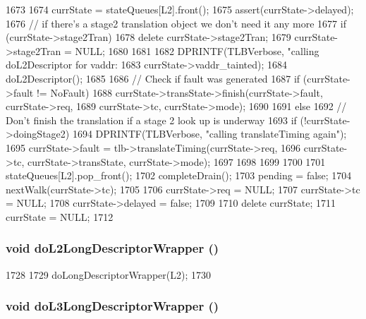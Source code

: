 \begin{DoxyCode}
1673 {
1674     currState = stateQueues[L2].front();
1675     assert(currState->delayed);
1676     // if there's a stage2 translation object we don't need it any more
1677     if (currState->stage2Tran) {
1678         delete currState->stage2Tran;
1679         currState->stage2Tran = NULL;
1680     }
1681 
1682     DPRINTF(TLBVerbose, "calling doL2Descriptor for vaddr:%
1683             currState->vaddr_tainted);
1684     doL2Descriptor();
1685 
1686     // Check if fault was generated
1687     if (currState->fault != NoFault) {
1688         currState->transState->finish(currState->fault, currState->req,
1689                                       currState->tc, currState->mode);
1690     }
1691     else {
1692         // Don't finish the translation if a stage 2 look up is underway
1693         if (!currState->doingStage2) {
1694             DPRINTF(TLBVerbose, "calling translateTiming again\n");
1695             currState->fault = tlb->translateTiming(currState->req,
1696                 currState->tc, currState->transState, currState->mode);
1697         }
1698     }
1699 
1700 
1701     stateQueues[L2].pop_front();
1702     completeDrain();
1703     pending = false;
1704     nextWalk(currState->tc);
1705 
1706     currState->req = NULL;
1707     currState->tc = NULL;
1708     currState->delayed = false;
1709 
1710     delete currState;
1711     currState = NULL;
1712 }
\end{DoxyCode}
\hypertarget{classArmISA_1_1TableWalker_adf9dfadd21c55c07039abb1f1931be60}{
\subsubsection[{doL2LongDescriptorWrapper}]{\setlength{\rightskip}{0pt plus 5cm}void doL2LongDescriptorWrapper ()}}
\label{classArmISA_1_1TableWalker_adf9dfadd21c55c07039abb1f1931be60}



\begin{DoxyCode}
1728 {
1729     doLongDescriptorWrapper(L2);
1730 }
\end{DoxyCode}
\hypertarget{classArmISA_1_1TableWalker_acc94f58219aff10336e1a78c77604dbb}{
\subsubsection[{doL3LongDescriptorWrapper}]{\setlength{\rightskip}{0pt plus 5cm}void doL3LongDescriptorWrapper ()}}
\label{classArmISA_1_1TableWalker_acc94f58219aff10336e1a78c77604dbb}



